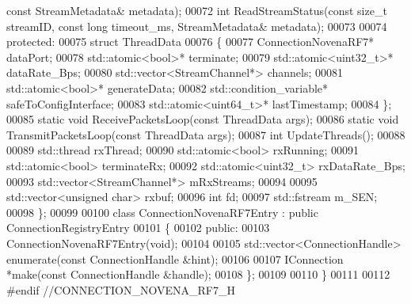 \begin{DoxyCode}
{      const} StreamMetadata& metadata);
00072     \textcolor{keywordtype}{int} ReadStreamStatus(\textcolor{keyword}{const} \textcolor{keywordtype}{size\_t} streamID, \textcolor{keyword}{const} \textcolor{keywordtype}{long} timeout\_ms, StreamMetadata& metadata);
00073 
00074 \textcolor{keyword}{protected}:
00075     \textcolor{keyword}{struct }ThreadData
00076     \{
00077         ConnectionNovenaRF7* dataPort; 
00078         std::atomic<bool>* terminate; 
00079         std::atomic<uint32\_t>* dataRate_Bps; 
00080         std::vector<StreamChannel*> channels; 
00081         std::atomic<bool>* generateData; 
00082         std::condition\_variable* safeToConfigInterface;
00083         std::atomic<uint64\_t>* lastTimestamp; 
00084     \};
00085     \textcolor{keyword}{static} \textcolor{keywordtype}{void} ReceivePacketsLoop(\textcolor{keyword}{const} ThreadData args);
00086     \textcolor{keyword}{static} \textcolor{keywordtype}{void} TransmitPacketsLoop(\textcolor{keyword}{const} ThreadData args);
00087     \textcolor{keywordtype}{int} UpdateThreads();
00088 
00089     std::thread rxThread;
00090     std::atomic<bool> rxRunning;
00091     std::atomic<bool> terminateRx;
00092     std::atomic<uint32\_t> rxDataRate_Bps;
00093     std::vector<StreamChannel*> mRxStreams;
00094 
00095     std::vector<unsigned char> rxbuf;
00096     \textcolor{keywordtype}{int} fd;
00097     std::fstream m_SEN;
00098 \};
00099 
00100 \textcolor{keyword}{class }ConnectionNovenaRF7Entry : \textcolor{keyword}{public} ConnectionRegistryEntry
00101 \{
00102 \textcolor{keyword}{public}:
00103     ConnectionNovenaRF7Entry(\textcolor{keywordtype}{void});
00104 
00105     std::vector<ConnectionHandle> enumerate(\textcolor{keyword}{const} ConnectionHandle &hint);
00106 
00107     IConnection *make(\textcolor{keyword}{const} ConnectionHandle &handle);
00108 \};
00109 
00110 \}
00111 
00112 \textcolor{preprocessor}{#endif //CONNECTION\_NOVENA\_RF7\_H}
\end{DoxyCode}
